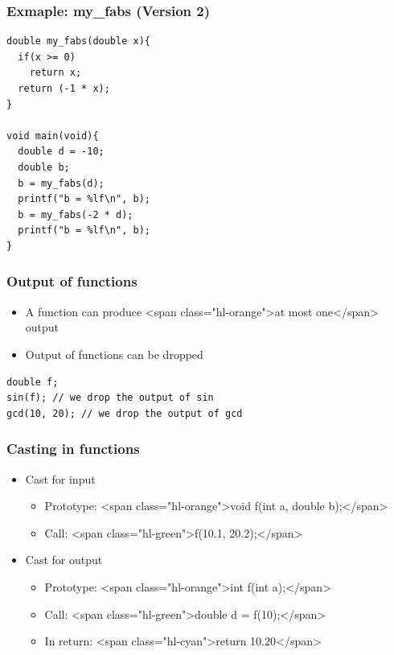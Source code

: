 \documentclass{../c-lecture}
\begin{document}
\begin{frame}[fragile]
  \frametitle{Exmaple: my_fabs (Version 2)}
  \begin{verbatim}
double my_fabs(double x){
  if(x >= 0)
    return x;
  return (-1 * x);
}

void main(void){
  double d = -10;
  double b;
  b = my_fabs(d);
  printf("b = %lf\n", b);
  b = my_fabs(-2 * d);
  printf("b = %lf\n", b);
}
  \end{verbatim}
\end{frame}

\begin{frame}[fragile]
  \frametitle{Output of functions}
  \begin{itemize}
    \item
      A function can produce
      <span class="hl-orange">at most one</span> output

    \item Output of functions can be dropped
  \end{itemize}
  \begin{verbatim}
double f;
sin(f); // we drop the output of sin
gcd(10, 20); // we drop the output of gcd
  \end{verbatim}
\end{frame}

\begin{frame}[fragile]
  \frametitle{Casting in functions}
  \begin{itemize}
    \item Cast for input
    \begin{itemize}
      \item
        Prototype: <span class="hl-orange">void f(int a, double b);</span>

      \item Call: <span class="hl-green">f(10.1, 20.2);</span>
    \end{itemize}
    \item Cast for output
    \begin{itemize}
      \item Prototype: <span class="hl-orange">int f(int a);</span>
      \item Call: <span class="hl-green">double d = f(10);</span>
      \item In return: <span class="hl-cyan">return 10.20</span>
    \end{itemize}
  \end{itemize}
\end{frame}
\end{document}
